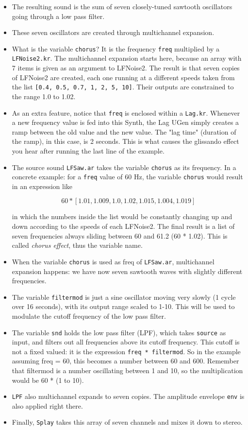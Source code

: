 \begin{itemize}
\item The resulting sound is the sum of seven closely-tuned sawtooth oscillators going through a low pass filter.
\item These seven oscillators are created through multichannel expansion.
\item What is the variable \texttt{chorus}? It is the frequency \texttt{freq} multiplied by a \texttt{LFNoise2.kr}. The multichannel expansion starts here, because an array with 7 items is given as an argument to LFNoise2. The result is that seven copies of LFNoise2 are created, each one running at a different speeds taken from the list \texttt{[0.4, 0.5, 0.7, 1, 2, 5, 10]}. Their outputs are constrained to the range 1.0 to 1.02.
\item As an extra feature, notice that \texttt{freq} is enclosed within a \texttt{Lag.kr}. Whenever a new frequency value is fed into this Synth, the Lag UGen simply creates a ramp between the old value and the new value. The "lag time" (duration of the ramp), in this case, is 2 seconds. This is what causes the glissando effect you hear after running the last line of the example.  
\item The source sound \texttt{LFSaw.ar} takes the variable \texttt{chorus} as its frequency. In a concrete example: for a \texttt{freq} value of 60 Hz, the variable \texttt{chorus} would result in an expression like

$$60 * [1.01, 1.009, 1.0, 1.02, 1.015, 1.004, 1.019]$$

in which the numbers inside the list would be constantly changing up and down according to the speeds of each LFNoise2. The final result is a list of seven frequencies always sliding between 60 and 61.2 (60 * 1.02). This is called \textit{chorus effect}, thus the variable name.
\item When the variable \texttt{chorus} is used as freq of \texttt{LFSaw.ar}, multichannel expansion happens: we have now seven sawtooth waves with slightly different frequencies.
\item The variable \texttt{filtermod} is just a sine oscillator moving very slowly (1 cycle over 16 seconds), with its output range scaled to 1-10. This will be used to modulate the cutoff frequency of the low pass filter.
\item The variable \texttt{snd} holds the low pass filter (LPF), which takes \texttt{source} as input, and filters out all frequencies above its cutoff frequency. This cutoff is not a fixed valued: it is the expression \texttt{freq * filtermod}. So in the example assuming freq = 60, this becomes a number between 60 and 600. Remember that filtermod is a number oscillating between 1 and 10, so the multiplication would be 60 * (1 to 10).
\item \texttt{LPF} also multichannel expands to seven copies. The amplitude envelope \texttt{env} is also applied right there.
\item Finally, \texttt{Splay} takes this array of seven channels and mixes it down to stereo.

\end{itemize}
 
